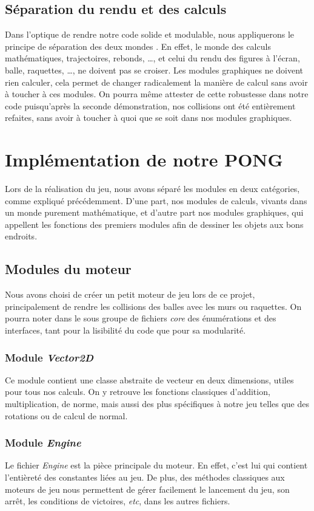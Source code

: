\documentclass[a4paper,10pt]{article}
\theoremstyle{definition}
\begin{document}
    \subsection{Séparation du rendu et des calculs}
    Dans l'optique de rendre notre code solide et modulable, nous appliquerons le principe de \og séparation des deux mondes \fg{}. En effet, le monde des calculs mathématiques, trajectoires, rebonds, \dots, et celui du rendu des figures à l'écran, balle, raquettes, \dots, ne doivent pas se croiser. Les modules graphiques ne doivent rien calculer, cela permet de changer radicalement la manière de calcul sans avoir à toucher à ces modules. On pourra même attester de cette robustesse dans notre code puisqu'après la seconde démonstration, nos collisions ont été entièrement refaites, sans avoir à toucher à quoi que se soit dans nos modules graphiques.
    
\section{Implémentation de notre PONG}
%

Lors de la réalisation du jeu, nous avons séparé les modules en deux catégories, comme expliqué précédemment. D'une part, nos modules de calculs, vivants dans un monde purement mathématique, et d'autre part nos modules graphiques, qui appellent les fonctions des premiers modules afin de dessiner les objets aux bons endroits.

    \subsection{Modules du moteur}
    Nous avons choisi de créer un petit moteur de jeu lors de ce projet, principalement de rendre les collisions des balles avec les murs ou raquettes. On pourra noter dans le sous groupe de fichiers \emph{core} des énumérations et des interfaces, tant pour la lisibilité du code que pour sa modularité.
    	
	\subsubsection{Module \emph{Vector2D}}
	Ce module contient une classe abstraite de vecteur en deux dimensions, utiles pour tous nos calculs. On y retrouve les fonctions classiques d'addition, multiplication, de norme, mais aussi des plus spécifiques à notre jeu telles que des rotations ou de calcul de normal.
	
	\subsubsection{Module \emph{Engine}}
	Le fichier \emph{Engine} est la pièce principale du moteur. En effet, c'est lui qui contient l'entièreté des constantes liées au jeu. De plus, des méthodes classiques aux moteurs de jeu nous permettent de gérer facilement le lancement du jeu, son arrêt, les conditions de victoires, \emph{etc}, dans les autres fichiers.
	
\end{document}

